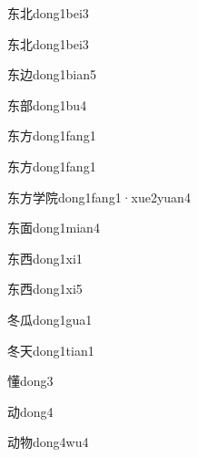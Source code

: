 \begin{verbete}[5;5]{东北}{dong1bei3}
\end{verbete}
\begin{verbete*}[5;5]{东北}{dong1bei3}
\end{verbete*}
\begin{verbete}[5;5]{东边}{dong1bian5}
\end{verbete}
\begin{verbete}[5;10]{东部}{dong1bu4}
\end{verbete}
\begin{verbete}[5;4]{东方}{dong1fang1}
\end{verbete}
\begin{verbete*}[5;4]{东方}{dong1fang1}
\end{verbete*}
\begin{verbete*}[5;4;8;9]{东方学院}{dong1fang1·xue2yuan4}
\end{verbete*}
\begin{verbete}[5;9]{东面}{dong1mian4}
\end{verbete}
\begin{verbete}[5;6]{东西}{dong1xi1}
\end{verbete}
\begin{verbete}[5;6]{东西}{dong1xi5}
\end{verbete}
\begin{verbete}[5;5]{冬瓜}{dong1gua1}
\end{verbete}
\begin{verbete}[5;4]{冬天}{dong1tian1}
\end{verbete}
\begin{verbete}[15]{懂}{dong3}
\end{verbete}
\begin{verbete}[6]{动}{dong4}
\end{verbete}
\begin{verbete}[6;8]{动物}{dong4wu4}
\end{verbete}
